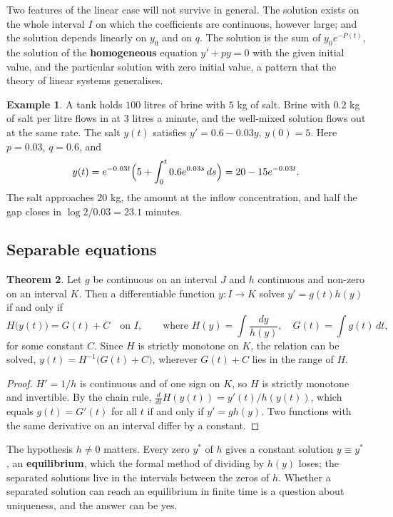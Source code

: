 \documentclass[11pt,a4paper]{article}
\numberwithin{equation}{section}
\theoremstyle{definition}
\newtheorem{thm}{Theorem}[subsection]
\newtheorem{exa}[thm]{Example}
\begin{document}
Two features of the linear case will not survive in general. The solution exists on the whole interval $I$ on which the coefficients are continuous,
however large; and the solution depends linearly on $y_0$ and on $q$. The solution is the sum of $y_0e^{-P(t)}$, the solution of the \textbf{homogeneous}
equation $y' + py = 0$ with the given initial value, and the particular solution with zero initial value, a pattern that the theory of linear systems
generalises.

\begin{exa}
\label{ex:mixing}
A tank holds $100$ litres of brine with $5$ kg of salt. Brine with $0.2$ kg of salt per litre flows in at $3$ litres a minute, and the well-mixed solution flows
out at the same rate. The salt $y(t)$ satisfies $y' = 0.6 - 0.03y$, $y(0) = 5$. Here $p = 0.03$, $q = 0.6$, and
\[
y(t) = e^{-0.03t}\Bigl(5 + \int_0^t0.6e^{0.03s}\,ds\Bigr) = 20 - 15e^{-0.03t} .
\]
The salt approaches $20$ kg, the amount at the inflow concentration, and half the gap closes in $\log 2/0.03 = 23.1$ minutes.
\end{exa}

\subsection{Separable equations}
\label{ssec:separable}

\begin{thm}
\label{thm:separable}
Let $g$ be continuous on an interval $J$ and $h$ continuous and non-zero on an interval $K$. Then a differentiable function $y\colon I \to K$ solves
$y' = g(t)h(y)$ if and only if
\[
H\bigl(y(t)\bigr) = G(t) + C \quad\text{on } I, \qquad\text{where } H(y) = \int\frac{dy}{h(y)}, \quad G(t) = \int g(t)\,dt,
\]
for some constant $C$. Since $H$ is strictly monotone on $K$, the relation can be solved, $y(t) = H^{-1}\bigl(G(t) + C\bigr)$, wherever $G(t) + C$ lies in the range of $H$.
\end{thm}

\begin{proof}
$H' = 1/h$ is continuous and of one sign on $K$, so $H$ is strictly monotone and invertible. By the chain rule, $\frac{d}{dt}H(y(t)) = y'(t)/h(y(t))$, which equals $g(t) = G'(t)$ for all
$t$ if and only if $y' = gh(y)$. Two functions with the same derivative on an interval differ by a constant.
\end{proof}

The hypothesis $h \neq 0$ matters. Every zero $y^*$ of $h$ gives a constant solution $y \equiv y^*$, an \textbf{equilibrium}, which the formal method of dividing by $h(y)$
loses; the separated solutions live in the intervals between the zeros of $h$. Whether a separated solution can reach an equilibrium in finite
time is a question about uniqueness, and the answer can be yes.
\end{document}
